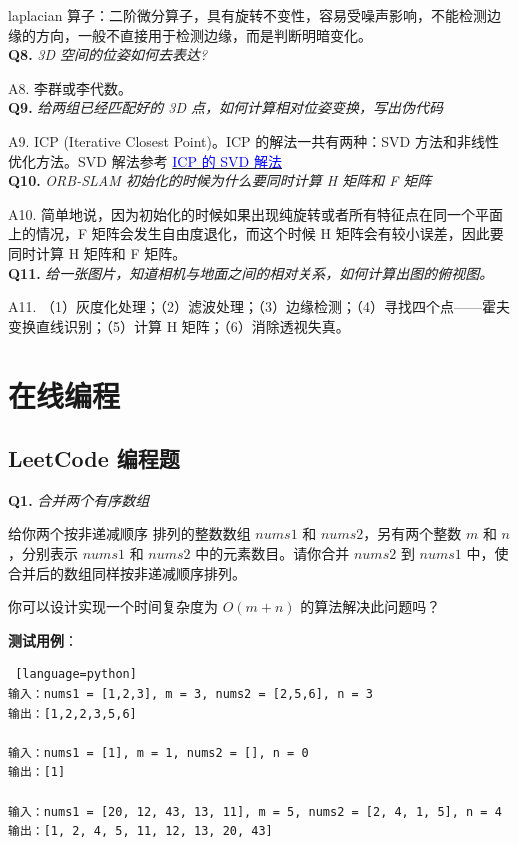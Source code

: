 \documentclass[cn,10pt,math=newtx,citestyle=gb7714-2015,bibstyle=gb7714-2015]{elegantbook}
\begin{document}
laplacian 算子：二阶微分算子，具有旋转不变性，容易受噪声影响，不能检测边缘的方向，一般不直接用于检测边缘，而是判断明暗变化。\\


\textbf{Q8.} \textit{3D 空间的位姿如何去表达?}

A8. 李群或李代数。\\


\textbf{Q9.} \textit{给两组已经匹配好的 3D 点，如何计算相对位姿变换，写出伪代码}

A9. ICP (Iterative Closest Point)。ICP 的解法一共有两种：SVD 方法和非线性优化方法。SVD 解法参考 \hyperlink{https://zhuanlan.zhihu.com/p/111933242}{\textcolor{blue}{ICP 的 SVD 解法}}\\


\textbf{Q10.} \textit{ORB-SLAM 初始化的时候为什么要同时计算 H 矩阵和 F 矩阵}

A10. 简单地说，因为初始化的时候如果出现纯旋转或者所有特征点在同一个平面上的情况，F 矩阵会发生自由度退化，而这个时候 H 矩阵会有较小误差，因此要同时计算 H 矩阵和 F 矩阵。\\


\textbf{Q11.} \textit{给一张图片，知道相机与地面之间的相对关系，如何计算出图的俯视图。}

A11. （1）灰度化处理；（2）滤波处理；（3）边缘检测；（4）寻找四个点——霍夫变换直线识别；（5）计算 H 矩阵；（6）消除透视失真。\\


\chapter{在线编程}

\section{LeetCode 编程题}

\textbf{Q1.} \textit{合并两个有序数组}

给你两个按非递减顺序 排列的整数数组 $nums1$ 和 $nums2$，另有两个整数 $m$ 和 $n$ ，分别表示 $nums1$ 和 $nums2$ 中的元素数目。请你合并 $nums2$ 到 $nums1$ 中，使合并后的数组同样按非递减顺序排列。

你可以设计实现一个时间复杂度为 $O(m + n)$ 的算法解决此问题吗？

\textbf{测试用例}：
\begin{lstlisting} [language=python]
输入：nums1 = [1,2,3], m = 3, nums2 = [2,5,6], n = 3
输出：[1,2,2,3,5,6]

输入：nums1 = [1], m = 1, nums2 = [], n = 0
输出：[1]

输入：nums1 = [20, 12, 43, 13, 11], m = 5, nums2 = [2, 4, 1, 5], n = 4
输出：[1, 2, 4, 5, 11, 12, 13, 20, 43]
\end{lstlisting}
\end{document}
